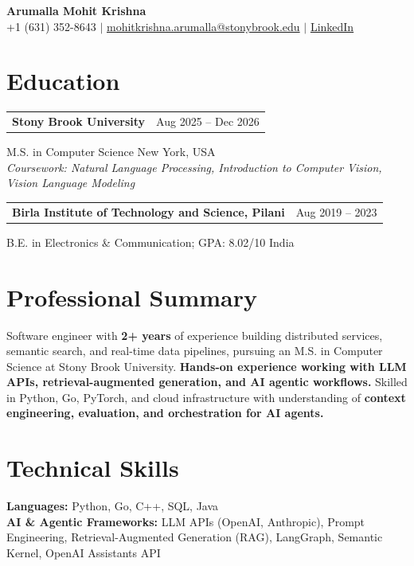 \documentclass[letterpaper,10pt]{article}
\makeatletter
\newcommand{\entry}[2]{%
  \noindent
  \begin{tabularx}{\linewidth}
    {@{}>{\raggedright\arraybackslash}X@{\hspace{6pt}}r@{}}
    \textbf{#1} & #2
  \end{tabularx}\par
}
\makeatother
\begin{document}
\begin{center}
    {\LARGE\bfseries Arumalla Mohit Krishna}\\[3pt]
    +1 (631) 352-8643 $|$
    \href{mailto:mohitkrishna.arumalla@stonybrook.edu}
    {mohitkrishna.arumalla@stonybrook.edu} $|$
    \href{https://linkedin.com/in/mohit-krishna-arumalla}
    {LinkedIn}
\end{center}
\vspace{-8pt}

\section{Education}

\entry
  {\textbf{Stony Brook University}}
  {Aug 2025 -- Dec 2026}

M.S. in Computer Science \hfill New York, USA\\
\textit{
Coursework: Natural Language Processing,
Introduction to Computer Vision, Vision Language Modeling
}
\vspace{3pt}

\entry
  {\textbf{Birla Institute of Technology and Science, Pilani}}
  {Aug 2019 -- 2023}

B.E. in Electronics \& Communication; GPA: 8.02/10 \hfill India
\section{Professional Summary}

Software engineer with \textbf{2+ years} of experience building distributed services,
semantic search, and real-time data pipelines, pursuing an M.S. in Computer
Science at Stony Brook University. \textbf{Hands-on experience working with LLM APIs, retrieval-augmented generation, and AI agentic workflows.} Skilled in Python, Go, PyTorch, and cloud infrastructure with understanding of \textbf{context engineering, evaluation, and orchestration for AI agents.}
\section{Technical Skills}

\textbf{Languages:}
Python, Go, C++, SQL, Java\\

\textbf{AI \& Agentic Frameworks:}
LLM APIs (OpenAI, Anthropic), Prompt Engineering, Retrieval-Augmented Generation (RAG), LangGraph, Semantic Kernel, OpenAI Assistants API\\
\end{document}
